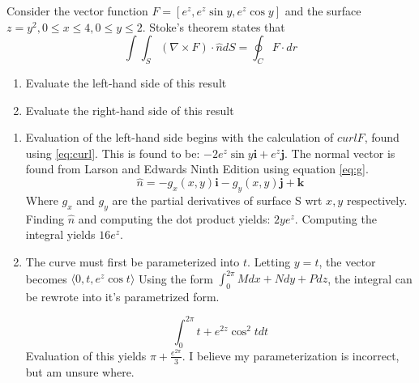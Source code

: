 Consider the vector function $F=[e^z,e^z\sin y, e^z \cos y]$ and the surface $z=y^2, 0\leq x\leq4, 0\leq y\leq2$. Stoke's theorem states that
	\begin{equation*}
		\int\int_S\left(\nabla\times F\right)\cdot\hat{n}dS=\oint_C F\cdot dr
	\end{equation*}
	
	\begin{enumerate}
		\item Evaluate the left-hand side of this result
		\item Evaluate the right-hand side of this result
	\end{enumerate}

	\begin{enumerate}
		\item Evaluation of the left-hand side begins with the calculation of $curl F$, found using \ref{eq:curl}. This is found to be: $-2e^z\sin y \boldsymbol{i}+e^z\boldsymbol{j}$. The normal vector is found from Larson and Edwards Ninth Edition using equation \ref{eq:g}.
		\begin{equation}
			\hat{n}=-g_x(x,y)\boldsymbol{i}-g_y(x,y)\boldsymbol{j}+\boldsymbol{k}
			\label{eq:g}
		\end{equation}
	Where $g_x$ and $g_y$ are the partial derivatives of surface S wrt $x,y$ respectively. Finding $\hat{n}$ and computing the dot product yields: $2ye^z$. Computing the integral yields $\boxed{16e^z}$.
	
	\item The curve must first be parameterized into $t$. Letting $y=t$, the vector becomes $\langle0, t, e^z\cos t\rangle$
	Using the form $\int_0^{2\pi} Mdx+Ndy+Pdz$, the integral can be rewrote into it's parametrized form. 
	
	\begin{equation*}
		\int_0^{2\pi} t+e^{2z}\cos^2tdt
	\end{equation*}
	Evaluation of this yields $\boxed{\pi+\frac{e^{2\pi}}{3}}$. I believe my parameterization is incorrect, but am unsure where.
\end{enumerate}